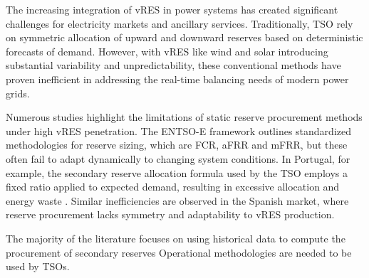 The increasing integration of \gls{vRES} in power systems has created significant challenges for electricity markets and ancillary services. Traditionally, \gls{TSO} rely on symmetric allocation of upward and downward reserves based on deterministic forecasts of demand. However, with \gls{vRES} like wind and solar introducing substantial variability and unpredictability, these conventional methods have proven inefficient in addressing the real-time balancing needs of modern power grids.\par
Numerous studies highlight the limitations of static reserve procurement methods under high vRES penetration. The \gls{ENTSO-E} framework \cite{handbook2009policy} outlines standardized methodologies for reserve sizing, which are \gls{FCR}, \gls{aFRR} and \gls{mFRR}, but these often fail to adapt dynamically to changing system conditions. In Portugal, for example, the secondary reserve allocation formula used by the \gls{TSO} employs a fixed ratio applied to expected demand, resulting in excessive allocation and energy waste %
. Similar inefficiencies are observed in the Spanish market, where reserve procurement lacks symmetry and adaptability to \gls{vRES} production.\par %
%
The majority of the literature focuses on using historical data to compute the procurement of secondary reserves \cite{Knorr:19,Frade2019_market,Papavasiliou:21}
%
Operational methodologies are needed to be used by TSOs.

